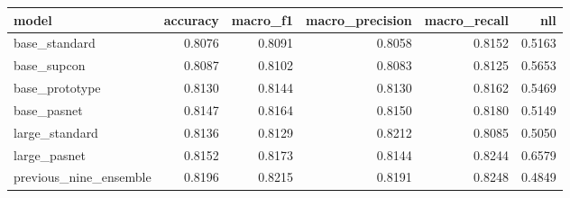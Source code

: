 \begin{tabular}{lrrrrr}
\toprule
model & accuracy & macro\_f1 & macro\_precision & macro\_recall & nll \\
\midrule
base\_standard & 0.8076 & 0.8091 & 0.8058 & 0.8152 & 0.5163 \\
base\_supcon & 0.8087 & 0.8102 & 0.8083 & 0.8125 & 0.5653 \\
base\_prototype & 0.8130 & 0.8144 & 0.8130 & 0.8162 & 0.5469 \\
base\_pasnet & 0.8147 & 0.8164 & 0.8150 & 0.8180 & 0.5149 \\
large\_standard & 0.8136 & 0.8129 & 0.8212 & 0.8085 & 0.5050 \\
large\_pasnet & 0.8152 & 0.8173 & 0.8144 & 0.8244 & 0.6579 \\
previous\_nine\_ensemble & 0.8196 & 0.8215 & 0.8191 & 0.8248 & 0.4849 \\
\bottomrule
\end{tabular}
